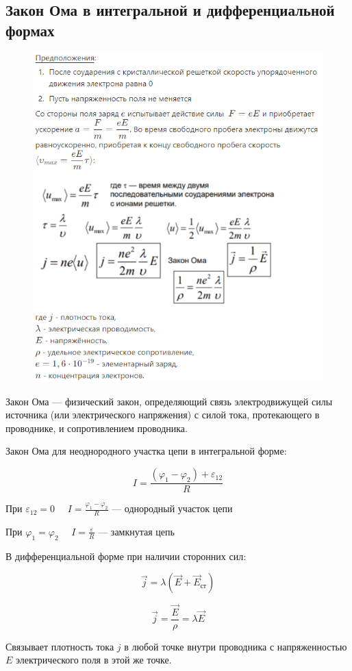 \subsection{Закон Ома в интегральной и дифференциальной формах}

\begin{figure}[h]
    \centering
    \includegraphics[width = 0.7\linewidth]{imgs/q30i1.png}
\end{figure}

\begin{definition}
    Закон Ома — физический закон, определяющий связь электродвижущей силы источника (или электрического напряжения) с силой тока, 
    протекающего в проводнике, и сопротивлением проводника.
\end{definition}

\begin{definition}
    Закон Ома для неоднородного участка цепи в интегральной форме:

    $$
    I=\frac{(\varphi_1-\varphi_2)+\varepsilon_{12}}{R}
    $$

    При $\varepsilon_{12}=0$ \ \  $I=\frac{\varphi_1-\varphi_2}{R}$ — однородный участок цепи

    При $\varphi_1=\varphi_2$ \ \ $I=\frac{\varepsilon}{R}$ — замкнутая цепь
\end{definition}

\begin{definition}
    В дифференциальной форме при наличии сторонних сил:

    $$
    \vec j=\lambda(\vec E+\vec E_{ст})
    $$

    $$
    \vec j=\frac{\vec E}{\rho}=\lambda\vec E
    $$

    Связывает плотность тока $j$ в любой точке внутри проводника с напряженностью $E$ электрического поля в этой же точке.
\end{definition}